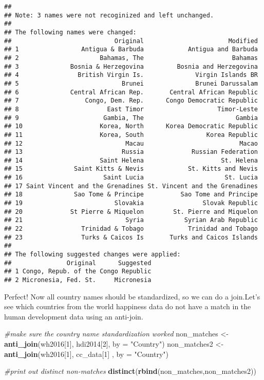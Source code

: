 \documentclass[]{article}
\newenvironment{Shaded}{\begin{snugshade}}{\end{snugshade}}
\newcommand{\CommentTok}[1]{\textcolor[rgb]{0.56,0.35,0.01}{\textit{#1}}}
\newcommand{\DataTypeTok}[1]{\textcolor[rgb]{0.13,0.29,0.53}{#1}}
\newcommand{\DecValTok}[1]{\textcolor[rgb]{0.00,0.00,0.81}{#1}}
\newcommand{\KeywordTok}[1]{\textcolor[rgb]{0.13,0.29,0.53}{\textbf{#1}}}
\newcommand{\NormalTok}[1]{#1}
\newcommand{\StringTok}[1]{\textcolor[rgb]{0.31,0.60,0.02}{#1}}
\begin{document}
\begin{verbatim}
## 
## Note: 3 names were not recoginized and left unchanged.
## 
## The following names were changed:
##                            Original                       Modified
## 1                 Antigua & Barbuda            Antigua and Barbuda
## 2                      Bahamas, The                        Bahamas
## 3              Bosnia & Herzegovina         Bosnia and Herzegovina
## 4                British Virgin Is.              Virgin Islands BR
## 5                            Brunei              Brunei Darussalam
## 6              Central African Rep.       Central African Republic
## 7                  Congo, Dem. Rep.      Congo Democratic Republic
## 8                        East Timor                    Timor-Leste
## 9                       Gambia, The                         Gambia
## 10                     Korea, North      Korea Democratic Republic
## 11                     Korea, South                 Korea Republic
## 12                            Macau                          Macao
## 13                           Russia             Russian Federation
## 14                     Saint Helena                     St. Helena
## 15              Saint Kitts & Nevis            St. Kitts and Nevis
## 16                      Saint Lucia                      St. Lucia
## 17 Saint Vincent and the Grenadines St. Vincent and the Grenadines
## 18              Sao Tome & Principe          Sao Tome and Principe
## 19                         Slovakia                Slovak Republic
## 20             St Pierre & Miquelon        St. Pierre and Miquelon
## 21                            Syria           Syrian Arab Republic
## 22                Trinidad & Tobago            Trinidad and Tobago
## 23                Turks & Caicos Is       Turks and Caicos Islands
## 
## The following suggested changes were applied:
##               Original      Suggested
## 1 Congo, Repub. of the Congo Republic
## 2 Micronesia, Fed. St.     Micronesia
\end{verbatim}

Perfect! Now all country names should be standardized, so we can do a
join.Let's see which countries from the world happiness data do not have
a match in the human development data using an anti-join.

\begin{Shaded}
\begin{Highlighting}[]
\CommentTok{#make sure the country name standardization worked}
\NormalTok{non_matches <-}\StringTok{ }\KeywordTok{anti_join}\NormalTok{(wh2016[}\DecValTok{1}\NormalTok{], hdi2014[}\DecValTok{2}\NormalTok{], }\DataTypeTok{by =} \StringTok{"Country"}\NormalTok{)}
\NormalTok{non_matches2 <-}\StringTok{ }\KeywordTok{anti_join}\NormalTok{(wh2016[}\DecValTok{1}\NormalTok{], cc_data[}\DecValTok{1}\NormalTok{] , }\DataTypeTok{by =} \StringTok{"Country"}\NormalTok{)}

\CommentTok{#print out distinct non-matches}
\KeywordTok{distinct}\NormalTok{(}\KeywordTok{rbind}\NormalTok{(non_matches,non_matches2))}
\end{Highlighting}
\end{Shaded}
\end{document}
